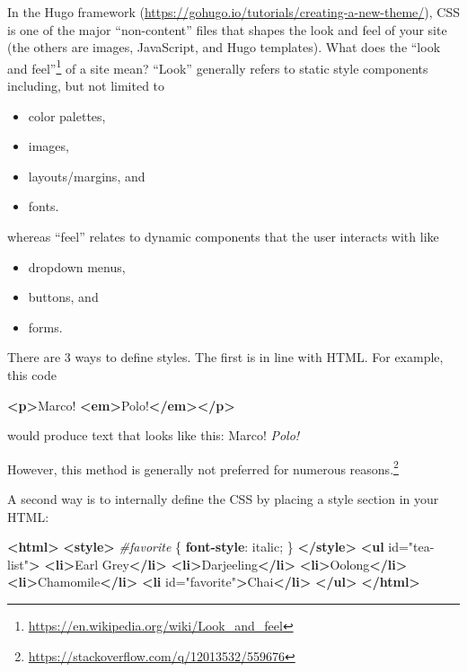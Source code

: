 \documentclass[12pt,]{krantz}
\makeatletter
\newenvironment{Shaded}{\begin{snugshade}}{\end{snugshade}}
\newcommand{\DecValTok}[1]{\textcolor[rgb]{0.00,0.00,0.81}{#1}}
\newcommand{\KeywordTok}[1]{\textcolor[rgb]{0.13,0.29,0.53}{\textbf{#1}}}
\newcommand{\NormalTok}[1]{#1}
\newcommand{\OtherTok}[1]{\textcolor[rgb]{0.56,0.35,0.01}{#1}}
\newcommand{\PreprocessorTok}[1]{\textcolor[rgb]{0.56,0.35,0.01}{\textit{#1}}}
\newcommand{\StringTok}[1]{\textcolor[rgb]{0.31,0.60,0.02}{#1}}
\providecommand{\tightlist}{%
  \setlength{\itemsep}{0pt}\setlength{\parskip}{0pt}}
\renewcommand{\href}[2]{#2\footnote{\url{#1}}}
\newenvironment{kframe}{%
\medskip{}
\setlength{\fboxsep}{.8em}
 \def\at@end@of@kframe{}%
 \ifinner\ifhmode%
  \def\at@end@of@kframe{\end{minipage}}%
  \begin{minipage}{\columnwidth}%
 \fi\fi%
 \def\FrameCommand##1{\hskip\@totalleftmargin \hskip-\fboxsep
 \colorbox{shadecolor}{##1}\hskip-\fboxsep
     \hskip-\linewidth \hskip-\@totalleftmargin \hskip\columnwidth}%
 \MakeFramed {\advance\hsize-\width
   \@totalleftmargin\z@ \linewidth\hsize
   \@setminipage}}%
 {\par\unskip\endMakeFramed%
 \at@end@of@kframe}
\renewenvironment{Shaded}{\begin{kframe}}{\end{kframe}}
\theoremstyle{definition}
\theoremstyle{definition}
\theoremstyle{definition}
\theoremstyle{remark}
\makeatother
\begin{document}
In the Hugo framework
(\url{https://gohugo.io/tutorials/creating-a-new-theme/}), CSS is one of
the major ``non-content'' files that shapes the look and feel of your
site (the others are images, JavaScript, and Hugo templates). What does
the \href{https://en.wikipedia.org/wiki/Look_and_feel}{``look and
feel''} of a site mean? ``Look'' generally refers to static style
components including, but not limited to

\begin{itemize}
\tightlist
\item
  color palettes,
\item
  images,
\item
  layouts/margins, and
\item
  fonts.
\end{itemize}

whereas ``feel'' relates to dynamic components that the user interacts
with like

\begin{itemize}
\tightlist
\item
  dropdown menus,
\item
  buttons, and
\item
  forms.
\end{itemize}

There are 3 ways to define styles. The first is in line with HTML. For
example, this code

\begin{Shaded}
\begin{Highlighting}[]
\KeywordTok{<p>}\NormalTok{Marco! }\KeywordTok{<em>}\NormalTok{Polo!}\KeywordTok{</em></p>} 
\end{Highlighting}
\end{Shaded}

would produce text that looks like this: Marco! \emph{Polo!}

However, this method is generally not preferred for
\href{https://stackoverflow.com/q/12013532/559676}{numerous reasons.}

A second way is to internally define the CSS by placing a style section
in your HTML:

\begin{Shaded}
\begin{Highlighting}[]
\KeywordTok{<html>}
\KeywordTok{<style>} 
\PreprocessorTok{#favorite}\NormalTok{ \{}
    \KeywordTok{font-style}\NormalTok{: }\DecValTok{italic}\NormalTok{;}
\NormalTok{\}}
\KeywordTok{</style>}
\KeywordTok{<ul}\OtherTok{ id=}\StringTok{"tea-list"}\KeywordTok{>}
  \KeywordTok{<li>}\NormalTok{Earl Grey}\KeywordTok{</li>}
  \KeywordTok{<li>}\NormalTok{Darjeeling}\KeywordTok{</li>}
  \KeywordTok{<li>}\NormalTok{Oolong}\KeywordTok{</li>}
  \KeywordTok{<li>}\NormalTok{Chamomile}\KeywordTok{</li>}
  \KeywordTok{<li}\OtherTok{ id=}\StringTok{"favorite"}\KeywordTok{>}\NormalTok{Chai}\KeywordTok{</li>}
\KeywordTok{</ul>}
\KeywordTok{</html>}
\end{Highlighting}
\end{Shaded}
\end{document}
